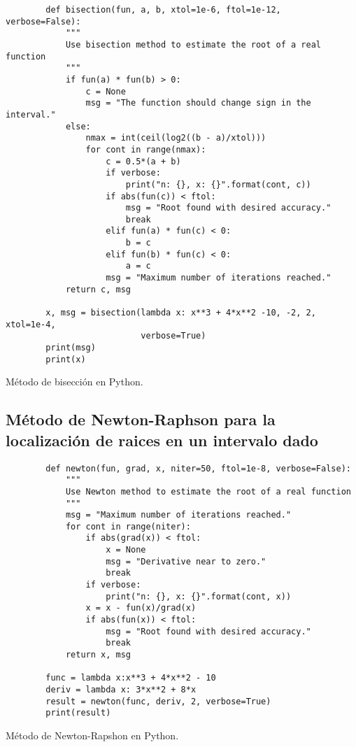 \begin{listing}[H]
    \begin{verbatim}
        def bisection(fun, a, b, xtol=1e-6, ftol=1e-12, verbose=False):
            """
            Use bisection method to estimate the root of a real function
            """
            if fun(a) * fun(b) > 0:
                c = None
                msg = "The function should change sign in the interval."
            else:
                nmax = int(ceil(log2((b - a)/xtol)))
                for cont in range(nmax):
                    c = 0.5*(a + b)
                    if verbose:
                        print("n: {}, x: {}".format(cont, c))
                    if abs(fun(c)) < ftol:
                        msg = "Root found with desired accuracy."
                        break
                    elif fun(a) * fun(c) < 0:
                        b = c
                    elif fun(b) * fun(c) < 0:
                        a = c
                    msg = "Maximum number of iterations reached."
            return c, msg
        
        x, msg = bisection(lambda x: x**3 + 4*x**2 -10, -2, 2, xtol=1e-4,
                           verbose=True)
        print(msg)
        print(x)
    \end{verbatim}
    \caption{Método de bisección en Python.}
    \label{lst:bisection}
\end{listing}


\subsection{Método de Newton-Raphson para la localización de raices en un intervalo dado}

\begin{listing}[H]
    \begin{verbatim}
        def newton(fun, grad, x, niter=50, ftol=1e-8, verbose=False):
            """
            Use Newton method to estimate the root of a real function
            """
            msg = "Maximum number of iterations reached."
            for cont in range(niter):
                if abs(grad(x)) < ftol:
                    x = None
                    msg = "Derivative near to zero."
                    break
                if verbose:
                    print("n: {}, x: {}".format(cont, x))
                x = x - fun(x)/grad(x)
                if abs(fun(x)) < ftol:
                    msg = "Root found with desired accuracy."
                    break
            return x, msg
        
        func = lambda x:x**3 + 4*x**2 - 10
        deriv = lambda x: 3*x**2 + 8*x
        result = newton(func, deriv, 2, verbose=True)
        print(result)
    \end{verbatim}
    \caption{Método de Newton-Rapshon en Python.}
    \label{lst:newton-raphson}
\end{listing}


